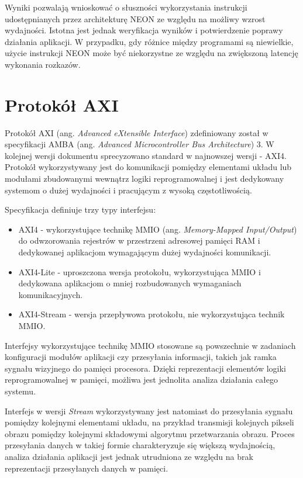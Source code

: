 Wyniki pozwalają wnioskować o słuszności wykorzystania instrukcji udostępnianych przez architekturę NEON ze względu na możliwy wzrost wydajności. Istotna jest jednak weryfikacja wyników i potwierdzenie poprawy działania aplikacji. W przypadku, gdy różnice między programami są niewielkie, użycie instrukcji NEON może być niekorzystne ze względu na zwiększoną latencję wykonania rozkazów.

\section{Protokół AXI}
\label{sec:axi-std}
Protokół AXI (ang. \emph{Advanced eXtensible Interface}) zdefiniowany został w specyfikacji AMBA (ang. \emph{Advanced Microcontroller Bus Architecture}) 3. W kolejnej wersji dokumentu sprecyzowano standard w najnowszej wersji - AXI4. \cite{axi-spec} Protokół wykorzystywany jest do komunikacji pomiędzy elementami układu lub modułami zbudowanymi wewnątrz logiki reprogramowalnej i jest dedykowany systemom o dużej wydajności i pracującym z wysoką częstotliwością.

Specyfikacja definiuje trzy typy interfejsu:
\begin{itemize}
	\item AXI4 - wykorzystujące technikę MMIO (ang. \emph{Memory-Mapped Input/Output}) do odwzorowania rejestrów w przestrzeni adresowej pamięci RAM i dedykowanej aplikacjom wymagającym dużej wydajności komunikacji.
	\item AXI4-Lite - uproszczona wersja protokołu, wykorzystująca MMIO i dedykowana aplikacjom o mniej rozbudowanych wymaganiach komunikacyjnych.
	\item AXI4-Stream - wersja przepływowa protokołu, nie wykorzystująca technik MMIO.
\end{itemize}

Interfejsy wykorzystujące technikę MMIO stosowane są powszechnie w zadaniach konfiguracji modułów aplikacji czy przesyłania informacji, takich jak ramka sygnału wizyjnego do pamięci procesora. Dzięki reprezentacji elementów logiki reprogramowalnej w pamięci, możliwa jest jednolita analiza działania całego systemu.

Interfejs w wersji \emph{Stream} wykorzystywany jest natomiast do przesyłania sygnału pomiędzy kolejnymi elementami układu, na przykład transmisji kolejnych pikseli obrazu pomiędzy kolejnymi składowymi algorytmu przetwarzania obrazu. Proces przesyłania danych w takiej formie charakteryzuje się większą wydajnością, analiza działania aplikacji jest jednak utrudniona ze względu na brak reprezentacji przesyłanych danych w pamięci.

